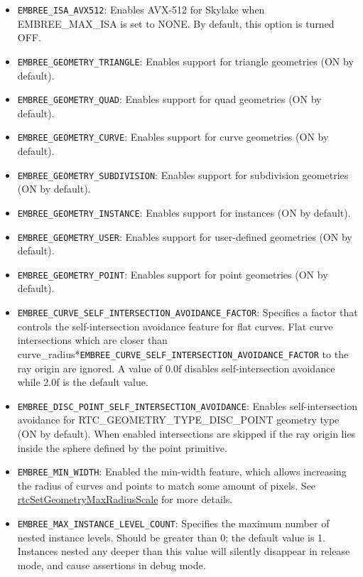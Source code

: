\begin{itemize}
  to NONE. By default, this option is turned OFF.
\item
  \texttt{EMBREE\_ISA\_AVX512}: Enables AVX-512 for Skylake when
  EMBREE\_MAX\_ISA is set to NONE. By default, this option is turned
  OFF.
\item
  \texttt{EMBREE\_GEOMETRY\_TRIANGLE}: Enables support for triangle
  geometries (ON by default).
\item
  \texttt{EMBREE\_GEOMETRY\_QUAD}: Enables support for quad geometries
  (ON by default).
\item
  \texttt{EMBREE\_GEOMETRY\_CURVE}: Enables support for curve geometries
  (ON by default).
\item
  \texttt{EMBREE\_GEOMETRY\_SUBDIVISION}: Enables support for
  subdivision geometries (ON by default).
\item
  \texttt{EMBREE\_GEOMETRY\_INSTANCE}: Enables support for instances (ON
  by default).
\item
  \texttt{EMBREE\_GEOMETRY\_USER}: Enables support for user-defined
  geometries (ON by default).
\item
  \texttt{EMBREE\_GEOMETRY\_POINT}: Enables support for point geometries
  (ON by default).
\item
  \texttt{EMBREE\_CURVE\_SELF\_INTERSECTION\_AVOIDANCE\_FACTOR}:
  Specifies a factor that controls the self-intersection avoidance
  feature for flat curves. Flat curve intersections which are closer
  than
  curve\_radius*\texttt{EMBREE\_CURVE\_SELF\_INTERSECTION\_AVOIDANCE\_FACTOR}
  to the ray origin are ignored. A value of 0.0f disables
  self-intersection avoidance while 2.0f is the default value.
\item
  \texttt{EMBREE\_DISC\_POINT\_SELF\_INTERSECTION\_AVOIDANCE}: Enables
  self-intersection avoidance for RTC\_GEOMETRY\_TYPE\_DISC\_POINT
  geometry type (ON by default). When enabled intersections are skipped
  if the ray origin lies inside the sphere defined by the point
  primitive.
\item
  \texttt{EMBREE\_MIN\_WIDTH}: Enabled the min-width feature, which
  allows increasing the radius of curves and points to match some amount
  of pixels. See
  \hyperref[rtcsetgeometrymaxradiusscale]{rtcSetGeometryMaxRadiusScale}
  for more details.
\item
  \texttt{EMBREE\_MAX\_INSTANCE\_LEVEL\_COUNT}: Specifies the maximum
  number of nested instance levels. Should be greater than 0; the
  default value is 1. Instances nested any deeper than this value will
  silently disappear in release mode, and cause assertions in debug
  mode.
\end{itemize}


